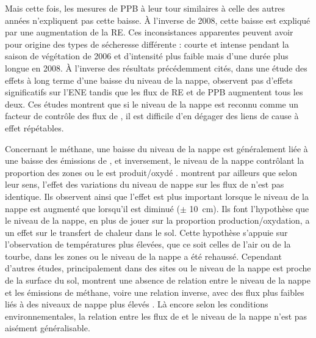 Mais cette fois, les mesures de PPB à leur tour similaires à celle des autres années n'expliquent pas cette baisse.
À l'inverse de 2008, cette baisse est expliqué par une augmentation de la RE.
Ces inconsistances apparentes peuvent avoir pour origine des types de sécheresse différente : courte et intense pendant la saison de végétation de 2006 et d'intensité plus faible mais d'une durée plus longue en 2008.
À l'inverse des résultats précédemment cités, \citet{ballantyne2014} dans une étude des effets à long terme d'une baisse du niveau de la nappe, observent pas d'effets significatifs sur l'ENE tandis que les flux de RE et de PPB augmentent tous les deux.
Ces études montrent que si le niveau de la nappe est reconnu comme un facteur de contrôle des flux de \coo, il est difficile d'en dégager des liens de cause à effet répétables.

Concernant le méthane, une baisse du niveau de la nappe est généralement liée à une baisse des émissions de \chh, et inversement, le niveau de la nappe contrôlant la proportion des zones ou le \chh est produit/oxydé \citep{pelletier2007}.
\citet{turetsky2008} montrent par ailleurs que selon leur sens, l'effet des variations du niveau de nappe sur les flux de \chh n'est pas identique.
Ils observent ainsi que l'effet est plus important lorsque le niveau de la nappe est augmenté que lorsqu'il est diminué ($\pm$ \SI{10}{\centi\metre}).
Ils font l'hypothèse que le niveau de la nappe, en plus de jouer sur la proportion production/oxydation, a un effet sur le transfert de chaleur dans le sol.
Cette hypothèse s'appuie sur l'observation de températures plus élevées, que ce soit celles de l'air ou de la tourbe, dans les zones ou le niveau de la nappe a été rehaussé.
Cependant d'autres études, principalement dans des sites ou le niveau de la nappe est proche de la surface du sol, montrent une absence de relation entre le niveau de la nappe et les émissions de méthane, voire une relation inverse, avec des flux plus faibles liés à des niveaux de nappe plus élevés \citep{kettunen1996,bellisario1999,treat2007}.
Là encore selon les conditions environnementales, la relation entre les flux de \chh et le niveau de la nappe n'est pas aisément généralisable.

